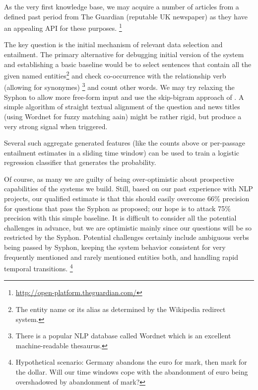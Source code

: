 \documentclass[11pt,a4paper]{article}
\begin{document}
As the very first knowledge base, we may acquire a number of articles
from a defined past period from The Guardian (reputable UK newspaper)
as they have an appealing API for these purposes.%
\footnote{\url{http://open-platform.theguardian.com/}}

The key question is the initial mechanism of relevant data selection
and entailment.  The primary alternative for debugging initial version
of the system and establishing a basic baseline would be to select
sentences that contain all the given named entities\footnote{The entity name or its alias as determined
by the Wikipedia redirect system.} and check co-occurrence with the
relationship verb (allowing for synonymes)%
\footnote{There is a popular NLP database called Wordnet which is
an excellent machine-readable thesaurus.} and count other words.
We may try relaxing the Syphon to allow more free-form input and
use the skip-bigram approach of \cite{WatsonEvidence}.
A simple algorithm of straight textual alignment of the question and news titles \cite{WatsonEvidence}
(using Wordnet for fuzzy matching aain) might be rather rigid,
but produce a very strong signal when triggered.

Several such aggregate generated features (like the counts above or
per-passage entailment estimates in a sliding time window) can be used
to train a logistic regression classifier that generates the probability.

Of course, as many we are guilty of being over-optimistic about prospective
capabilities of the systems we build.
Still, based on our past experience with NLP projects, our qualified estimate
is that this should easily overcome 66\% precision for questions that
pass the Syphon as proposed; our hope is to attack 75\% precision with
this simple baseline.  It is difficult to consider all the potential
challenges in advance, but we are optimistic mainly since our questions
will be so restricted by the Syphon.  Potential challenges certainly include
ambiguous verbs being passed by Syphon, keeping the system behavior consistent
for very frequently mentioned and rarely mentioned entities both, and handling
rapid temporal transitions.%
\footnote{Hypothetical scenario: Germany abandons the euro for mark,
then mark for the dollar.  Will our time windows cope with the abandonment
of euro being overshadowed by abandonment of mark?}
\end{document}
